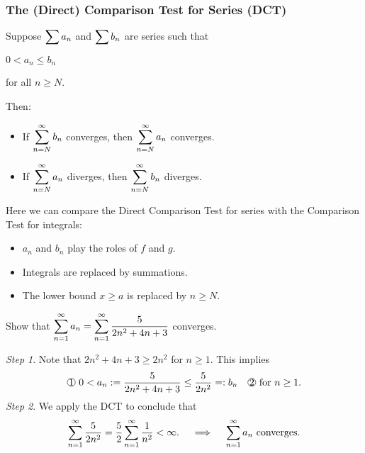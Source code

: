 \subsubsection{The (Direct) Comparison Test for Series (DCT)}
\begin{thm}
    Suppose $\displaystyle\sum a_n$ and $\displaystyle\sum b_n$ are series such that \begin{enumerate*}[label = \circled{\arabic*}]
        \item $0 < a_n \leq b_n$ 
        \item for all $n \geq N$. 
    \end{enumerate*}
    Then:
    \begin{itemize}
        \item If $\displaystyle\sum_{n=N}^\infty b_n$ converges, then $\displaystyle\sum_{n=N}^\infty a_n$ converges.
        \item If $\displaystyle\sum_{n=N}^\infty a_n$ diverges, then $\displaystyle\sum_{n=N}^\infty b_n$ diverges.
    \end{itemize}
\end{thm}

\begin{rmk}
    Here we can compare the Direct Comparison Test for series with the Comparison Test for integrals:
    \begin{itemize}
        \item $a_n$ and $b_n$ play the roles of $f$ and $g$.
        \item Integrals are replaced by summations.
        \item The lower bound $x \geq a$ is replaced by $n \geq N$.
    \end{itemize}
\end{rmk}


\begin{ex} Show that $\displaystyle\sum_{n=1}^\infty a_n = \displaystyle\sum_{n=1}^\infty  \dfrac{5}{2n^2+4n+3}$ converges.

\textit{Step 1}. Note that $2n^2+4n+3 \geq 2n^2$ for $n \geq 1$. This implies 
\[\circled{1}~0 < a_n : = \dfrac{5}{2n^2+4n+3} \leq \dfrac{5}{2n^2} =: b_n \quad \circled{2}~ \text{for } n \geq 1.\]
\textit{Step 2}. We apply the DCT to conclude that 
\[\displaystyle\sum_{n=1}^\infty  \dfrac{5}{2n^2} = \dfrac{5}{2} \displaystyle\sum_{n=1}^\infty  \dfrac{1}{n^2} < \infty. \quad \implies \quad \displaystyle\sum_{n=1}^\infty a_n \text{ converges}.\]
\end{ex}

